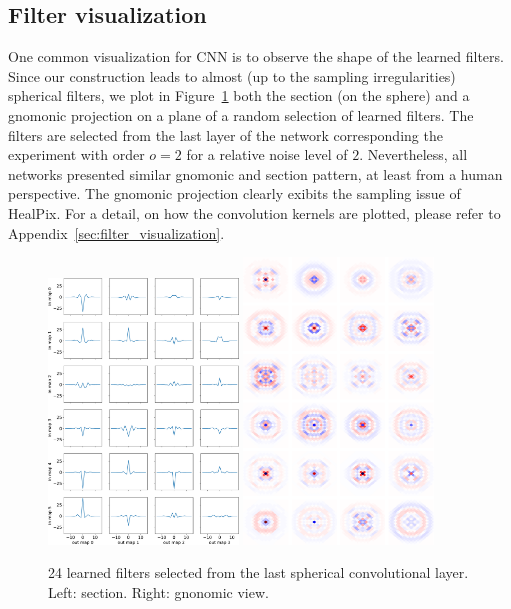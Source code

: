 \documentclass[final,twocolumn,3p,times,authoryear]{elsarticle}
\newcommand{\todo}[1]{{\color[rgb]{.6,.1,.6}{#1}}}
\newcommand{\figref}[1]{Figure~\ref{fig:#1}}
\newcommand{\1}{\b{1}}              %
\newcommand{\0}{\b{0}}              %
\begin{document}
\subsection{Filter visualization}
One common visualization for CNN is to observe the shape of the learned filters.
Since our construction leads to almost (up to the sampling irregularities)
spherical filters, we plot in \figref{learned_filter} both the section (on the
sphere) and a gnomonic projection on a plane of a random selection of learned
filters. The filters are selected from the last layer of the network
corresponding the experiment with order $o=2$ for a relative noise level of
$2$. Nevertheless, all networks presented similar gnomonic and section pattern, at least from a
human perspective. The gnomonic projection clearly exibits the sampling issue
of HealPix. For a detail, on how the convolution kernels are plotted, please refer to Appendix~\ref{sec:filter_visualization}.
\todo{Tomek: can you say something about the filters.}

\begin{figure}[!ht]
\centering
\includegraphics[width=0.45\textwidth]{figures/section_filter_last.pdf}
\includegraphics[width=0.45\textwidth]{figures/gnonomic_filter_last.pdf}
\caption{24 learned filters selected from the last spherical convolutional layer. Left: section. Right: gnonomic view.}
\label{fig:learned_filter}
\end{figure}
\end{document}
